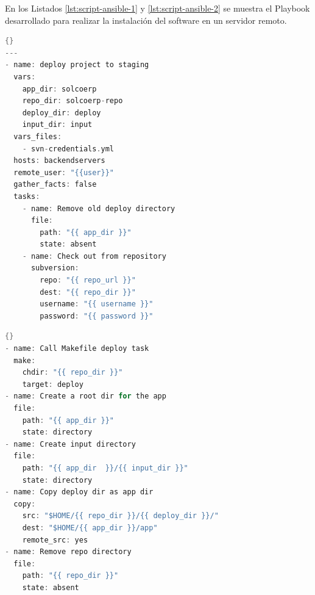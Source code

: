 En los Listados \ref{lst:script-ansible-1} y \ref{lst:script-ansible-2} se muestra el Playbook desarrollado para realizar la instalación del software en un servidor remoto.

\noindent\begin{minipage}{.45\textwidth}
	\begin{lstlisting}[language=C,caption={Playbook parte 1},label={lst:script-ansible-1}]{}
---
- name: deploy project to staging
  vars:
    app_dir: solcoerp
    repo_dir: solcoerp-repo
    deploy_dir: deploy
    input_dir: input
  vars_files:
    - svn-credentials.yml
  hosts: backendservers
  remote_user: "{{user}}"
  gather_facts: false
  tasks:
    - name: Remove old deploy directory
      file:
        path: "{{ app_dir }}"
        state: absent
    - name: Check out from repository
      subversion: 
        repo: "{{ repo_url }}"
        dest: "{{ repo_dir }}"
        username: "{{ username }}"
        password: "{{ password }}"
	\end{lstlisting}
\end{minipage}\hfill
\begin{minipage}{.45\textwidth}
	\begin{lstlisting}[language=C,caption={Playbook parte 2},label=lst:script-ansible-2]{}
- name: Call Makefile deploy task
  make:
    chdir: "{{ repo_dir }}"
    target: deploy
- name: Create a root dir for the app 
  file:
    path: "{{ app_dir }}"
    state: directory
- name: Create input directory
  file:
    path: "{{ app_dir  }}/{{ input_dir }}"
    state: directory
- name: Copy deploy dir as app dir 
  copy:
    src: "$HOME/{{ repo_dir }}/{{ deploy_dir }}/"
    dest: "$HOME/{{ app_dir }}/app"
    remote_src: yes 
- name: Remove repo directory
  file:
    path: "{{ repo_dir }}"
    state: absent
	\end{lstlisting}
\end{minipage}


